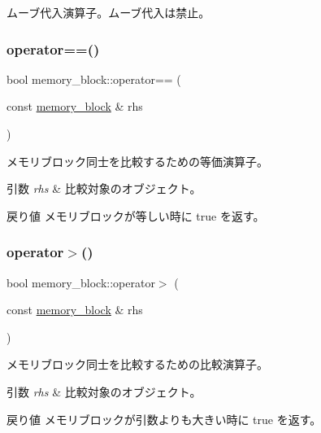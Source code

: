 ムーブ代入演算子。ムーブ代入は禁止。 \hypertarget{classmemory__block_a2622810f660307cb9d39516973abac9b}{}\label{classmemory__block_a2622810f660307cb9d39516973abac9b} 
\subsubsection{\texorpdfstring{operator==()}{operator==()}}
{\footnotesize\ttfamily bool memory\+\_\+block\+::operator== (\begin{DoxyParamCaption}\item[{const \hyperlink{classmemory__block}{memory\+\_\+block} \&}]{rhs }\end{DoxyParamCaption})}

メモリブロック同士を比較するための等価演算子。 
\begin{DoxyParams}{引数}
{\em rhs} & 比較対象のオブジェクト。 \\
\hline
\end{DoxyParams}
\begin{DoxyReturn}{戻り値}
メモリブロックが等しい時に true を返す。 
\end{DoxyReturn}
\hypertarget{classmemory__block_abba4d7c05d916aafc08b58187fd92fad}{}\label{classmemory__block_abba4d7c05d916aafc08b58187fd92fad} 
\subsubsection{\texorpdfstring{operator$>$()}{operator>()}}
{\footnotesize\ttfamily bool memory\+\_\+block\+::operator$>$ (\begin{DoxyParamCaption}\item[{const \hyperlink{classmemory__block}{memory\+\_\+block} \&}]{rhs }\end{DoxyParamCaption})}

メモリブロック同士を比較するための比較演算子。 
\begin{DoxyParams}{引数}
{\em rhs} & 比較対象のオブジェクト。 \\
\hline
\end{DoxyParams}
\begin{DoxyReturn}{戻り値}
メモリブロックが引数よりも大きい時に true を返す。 
\end{DoxyReturn}
\hypertarget{classmemory__block_adb448dde189fdedec8793fd3dcb4674a}{}\label{classmemory__block_adb448dde189fdedec8793fd3dcb4674a} 
